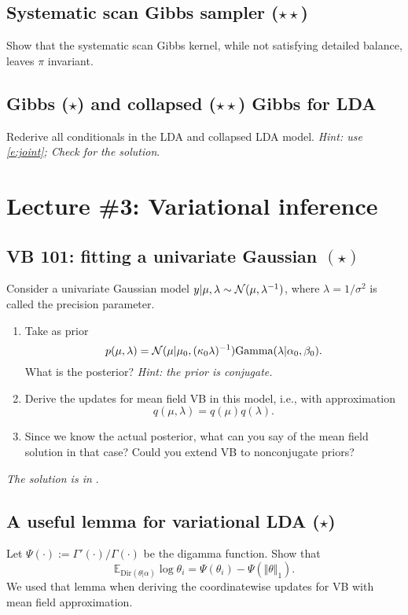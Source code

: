 \documentclass{article}
\begin{document}
\subsection{Systematic scan Gibbs sampler ($\star\star$)}
Show that the systematic scan Gibbs kernel, while not satisfying detailed balance, leaves $\pi$ invariant.

\subsection{Gibbs ($\star$) and collapsed ($\star\star$) Gibbs for LDA}
Rederive all conditionals in the LDA and collapsed LDA model.  \emph{Hint: use \eqref{e:joint}; Check \citep[Section 27.3.4]{Mur12} for the solution}.

\section{Lecture \#3: Variational inference}

\subsection{VB 101: fitting a univariate Gaussian $(\star)$}
Consider a univariate Gaussian model $y\vert \mu,\lambda \sim \mathcal{N}(\mu, \lambda^{-1})$, where $\lambda=1/\sigma^2$ is called the precision parameter.
\begin{enumerate}
\item Take as prior
$$
p(\mu, \lambda) = \mathcal{N}(\mu\vert \mu_0, (\kappa_0\lambda)^{-1}) \text{Gamma}(\lambda\vert \alpha_0, \beta_0).
$$
What is the posterior? \emph{Hint: the prior is conjugate.}
\item Derive the updates for mean field VB in this model, i.e., with approximation
$$ q(\mu, \lambda) = q(\mu) q(\lambda).$$
\item Since we know the actual posterior, what can you say of the mean field solution in that case? Could you extend VB to nonconjugate priors?
\end{enumerate}
\emph{The solution is in \citep[Section 21.5.1]{Mur12}}.

\subsection{A useful lemma for variational LDA ($\star$)}
Let $\Psi(\cdot) := \Gamma'(\cdot)/\Gamma(\cdot)$ be the digamma function. Show that
$$
\mathbb{E}_{\text{Dir}(\theta\vert\alpha)} \log \theta_i = \Psi(\theta_i) - \Psi(\Vert \theta\Vert_1).
$$
We used that lemma when deriving the coordinatewise updates for VB with mean field approximation.
\end{document}
